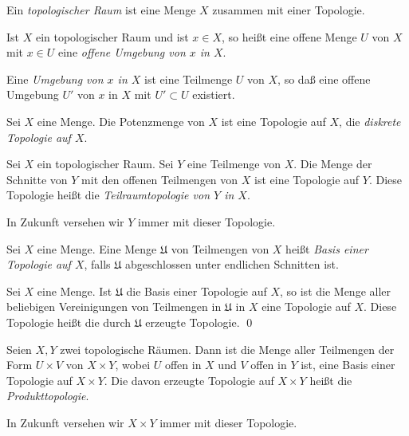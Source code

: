 \begin{definition}
		Ein \emph{topologischer Raum} ist eine Menge \(X\) zusammen mit einer Topologie.
		
		Ist \(X\) ein topologischer Raum und ist \(x \in X\), so heißt eine offene Menge \(U\) von \(X\) mit \(x \in U\)
		eine \emph{offene Umgebung von \(x\) in \(X\)}.
		
		Eine \emph{Umgebung von \(x\) in \(X\)} ist eine Teilmenge \(U\) von \(X\), so daß eine offene Umgebung
		\(U'\) von \(x\) in \(X\) mit \(U' \subset U\) existiert. 
\end{definition}

\begin{example}
	Sei \(X\) eine Menge. Die Potenzmenge von \(X\) ist eine Topologie auf \(X\), die \emph{diskrete Topologie
	auf \(X\)}.
\end{example}

\begin{example}
	Sei \(X\) ein topologischer Raum. Sei \(Y\) eine Teilmenge von \(X\). Die Menge der Schnitte von \(Y\) mit den
	offenen Teilmengen von \(X\) ist eine Topologie auf \(Y\). Diese Topologie heißt die \emph{Teilraumtopologie
	von \(Y\) in \(X\)}.
	
	In Zukunft versehen wir \(Y\) immer mit dieser Topologie.
\end{example}

\begin{definition}
	Sei \(X\) eine Menge. Eine Menge \(\mathfrak U\) von Teilmengen von \(X\) heißt
	\emph{Basis einer Topologie auf \(X\)}, falls \(\mathfrak U\) abgeschlossen unter endlichen
	Schnitten ist.
\end{definition}

\begin{proposition}
	Sei \(X\) eine Menge. Ist \(\mathfrak U\) die Basis einer Topologie auf \(X\), so
	ist die Menge aller beliebigen Vereinigungen von Teilmengen in \(\mathfrak U\) in \(X\)
	eine Topologie auf \(X\). Diese Topologie heißt die durch \(\mathfrak U\) erzeugte Topologie.
    \qed
\end{proposition}

\begin{example}
	Seien \(X, Y\) zwei topologische Räumen. Dann ist die Menge aller Teilmengen der Form
	\(U \times V\) von \(X \times Y\), wobei \(U\) offen in \(X\) und \(V\) offen in \(Y\) ist,
	eine Basis einer Topologie auf \(X \times Y\). Die davon erzeugte Topologie auf \(X \times Y\)
	heißt die \emph{Produkttopologie}.
	
	In Zukunft versehen wir \(X \times Y\) immer mit dieser Topologie.
\end{example}

